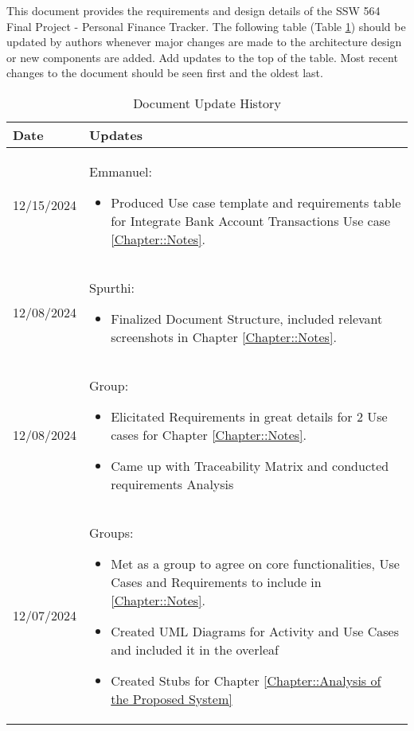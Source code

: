 This document provides the requirements and design details of the
SSW 564 Final Project - Personal Finance Tracker. The following table (Table \ref{Table::UpdateHistory}) should be
updated by authors whenever major changes are made to the architecture
design or new components are added. Add updates to the top of the table.  
Most recent changes to the document should be seen first and the oldest 
last.

\begin{longtable}{|l||p{13.5cm}|}
\caption{Document Update History \label{Table::UpdateHistory}}\\
\hline
\textbf{Date} & \textbf{Updates} \\
\hline 
\endhead

12/15/2024 & Emmanuel:
\begin{itemize}[topsep=0pt,itemsep=0pt,parsep=0pt,partopsep=0pt,leftmargin=12pt]
    \item Produced Use case template and requirements table for Integrate Bank Account Transactions Use case \ref{Chapter::Notes}.
\end{itemize} 
\\ \hline

12/08/2024 & Spurthi:
\begin{itemize}[topsep=0pt,itemsep=0pt,parsep=0pt,partopsep=0pt,leftmargin=12pt]
    \item Finalized Document Structure, included relevant screenshots in Chapter \ref{Chapter::Notes}.
\end{itemize} 
\\ \hline

12/08/2024 & Group:
\begin{itemize}[topsep=0pt,itemsep=0pt,parsep=0pt,partopsep=0pt,leftmargin=12pt]
    \item Elicitated Requirements in great details for 2 Use cases for Chapter \ref{Chapter::Notes}.
    \item Came up with Traceability Matrix and conducted requirements Analysis 
\end{itemize} 
\\ \hline

12/07/2024 & Groups:
\begin{itemize}[topsep=0pt,itemsep=0pt,parsep=0pt,partopsep=0pt,leftmargin=12pt]
    \item Met as a group to agree on core functionalities, Use Cases and Requirements to include in  \ref{Chapter::Notes}.
    \item Created UML Diagrams for Activity and Use Cases and included it in the overleaf
    \item Created Stubs for Chapter \ref{Chapter::Analysis of the Proposed System}
\end{itemize} 
\\ \hline


\end{longtable}
